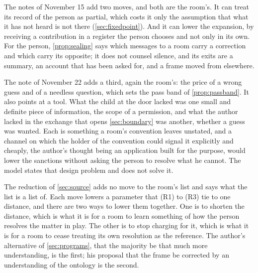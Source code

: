 The notes of November 15 add two moves, and both are the room's. It can treat its record of the person as partial, which costs it only the assumption that what it has not heard is not there (\autoref{sec:fixedpoint}). And it can lower the expansion, by receiving a contribution in a register the person chooses and not only in its own.
For the person, \autoref{prop:sealing} says which messages to a room carry a correction and which carry its opposite; it does not counsel silence, and its exits are a summary, an account that has been asked for, and a frame moved from elsewhere.

The note of November 22 adds a third, again the room's: the price of a wrong guess and of a needless question, which sets the pass band of \autoref{prop:passband}. It also points at a tool. What the child at the door lacked was one small and definite piece of information, the scope of a permission, and what the author lacked in the exchange that opens \autoref{sec:boundary} was another, whether a guess was wanted. Each is something a room's convention leaves unstated, and a channel on which the holder of the convention could signal it explicitly and cheaply, the author's thought being an application built for the purpose, would lower the sanctions without asking the person to resolve what he cannot. The model states that design problem and does not solve it.

The reduction of \autoref{sec:source} adds no move to the room's list and says what the list is a list of. Each move lowers a parameter that (R1) to (R3) tie to one distance, and there are two ways to lower them together. One is to shorten the distance, which is what it is for a room to learn something of how the person resolves the matter in play. The other is to stop charging for it, which is what it is for a room to cease treating its own resolution as the reference. The author's alternative of \autoref{sec:programs}, that the majority be that much more understanding, is the first; his proposal that the frame be corrected by an understanding of the ontology is the second.

